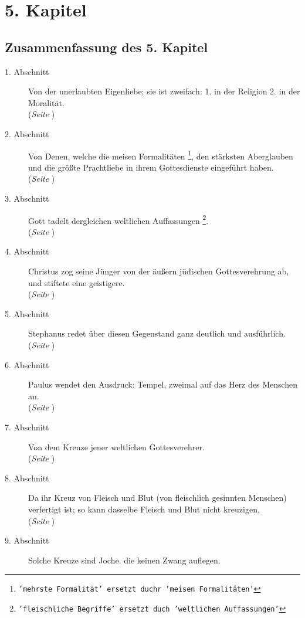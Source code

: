 

\chapter{5. Kapitel} \label{kap5}

\section{Zusammenfassung des 5. Kapitel}
\footnotesize
\begin{description}
\item[1. Abschnitt] Von der unerlaubten Eigenliebe; sie ist zweifach: 1. in der
Religion  2. in der Moralität.
\\(\textit{Seite \pageref{kap5_ab1}})
\item[2. Abschnitt] Von Denen, welche die meisen Formalitäten
\footnote{\texttt{'mehrste Formalität' ersetzt duchr 'meisen Formalitäten'}}, den
stärksten
Aberglauben und die größte Prachtliebe in ihrem Gottesdienste eingeführt haben.
\\(\textit{Seite \pageref{kap5_ab2}})
\item[3. Abschnitt] Gott tadelt dergleichen weltlichen Auffassungen
\footnote{\texttt{'fleischliche Begriffe' ersetzt duch 'weltlichen Auffassungen'}}.
\\(\textit{Seite \pageref{kap5_ab3}})
\item[4. Abschnitt] Christus zog seine Jünger von der äußern jüdischen
Gottesverehrung ab, und stiftete eine geistigere.
\\(\textit{Seite \pageref{kap5_ab4}})
\item[5. Abschnitt] Stephanus redet über diesen Gegenstand ganz deutlich und
ausführlich.
\\(\textit{Seite \pageref{kap5_ab5}})
\item[6. Abschnitt] Paulus wendet den Ausdruck: Tempel, zweimal auf das Herz des
Menschen an.
\\(\textit{Seite \pageref{kap5_ab6}})
\item[7. Abschnitt] Von dem Kreuze jener weltlichen Gottesverehrer.
\\(\textit{Seite \pageref{kap5_ab7}})
\item[8. Abschnitt] Da ihr Kreuz von Fleisch und Blut (von fleischlich gesinnten
Menschen) verfertigt ist; so kann dasselbe Fleisch und Blut nicht kreuzigen,
\\(\textit{Seite \pageref{kap5_ab8}})
\item[9. Abschnitt] Solche Kreuze sind Joche. die keinen Zwang auflegen.

\end{description}
